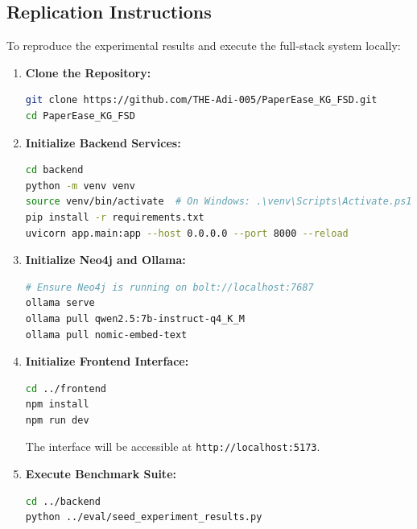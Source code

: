 \subsection*{Replication Instructions}
To reproduce the experimental results and execute the full-stack system locally:
\begin{enumerate}
    \item \textbf{Clone the Repository:}
    \begin{lstlisting}[language=bash]
git clone https://github.com/THE-Adi-005/PaperEase_KG_FSD.git
cd PaperEase_KG_FSD
    \end{lstlisting}
    
    \item \textbf{Initialize Backend Services:}
    \begin{lstlisting}[language=bash]
cd backend
python -m venv venv
source venv/bin/activate  # On Windows: .\venv\Scripts\Activate.ps1
pip install -r requirements.txt
uvicorn app.main:app --host 0.0.0.0 --port 8000 --reload
    \end{lstlisting}
    
    \item \textbf{Initialize Neo4j and Ollama:}
    \begin{lstlisting}[language=bash]
# Ensure Neo4j is running on bolt://localhost:7687
ollama serve
ollama pull qwen2.5:7b-instruct-q4_K_M
ollama pull nomic-embed-text
    \end{lstlisting}
    
    \item \textbf{Initialize Frontend Interface:}
    \begin{lstlisting}[language=bash]
cd ../frontend
npm install
npm run dev
    \end{lstlisting}
    The interface will be accessible at \texttt{http://localhost:5173}.
    
    \item \textbf{Execute Benchmark Suite:}
    \begin{lstlisting}[language=bash]
cd ../backend
python ../eval/seed_experiment_results.py
    \end{lstlisting}
\end{enumerate}

